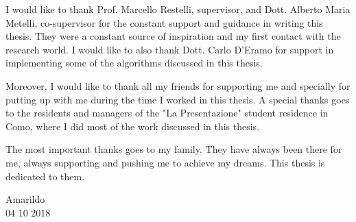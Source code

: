 I would like to thank Prof. Marcello Restelli, supervisor, and Dott. Alberto Maria Metelli, co-supervisor for the constant support and guidance in writing this thesis. They were a constant source of inspiration and my first contact with the research world. I would like to also thank Dott. Carlo D'Eramo for support in implementing some of the algorithms discussed in this thesis.\par 
Moreover, I would like to thank all my friends for supporting me and specially for putting up with me during the time I worked in this thesis. A special thanks goes to the residents and managers of the "La Presentazione" student residence in Como, where I did most of the work discussed in this thesis.\par
The most important thanks goes to my family. They have always been there for me, always supporting and pushing me to achieve my dreams. This thesis is dedicated to them.
\begin{flushright}


  Amarildo \\ 04 10 2018 \\ 


\end{flushright}